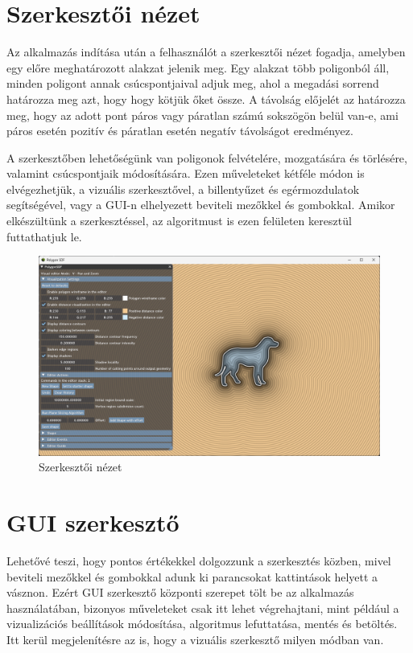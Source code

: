 \section{Szerkesztői nézet}

Az alkalmazás indítása után a felhasználót a szerkesztői nézet fogadja, amelyben egy előre meghatározott alakzat jelenik meg. Egy alakzat több poligonból áll, minden poligont annak csúcspontjaival adjuk meg, ahol a megadási sorrend határozza meg azt, hogy hogy kötjük őket össze. A távolság előjelét az határozza meg, hogy az adott pont páros vagy páratlan számú sokszögön belül van-e, ami páros esetén pozitív és páratlan esetén negatív távolságot eredményez.

A szerkesztőben lehetőségünk van poligonok felvételére, mozgatására és törlésére, valamint csúcspontjaik módosítására. Ezen műveleteket kétféle módon is elvégezhetjük, a vizuális szerkesztővel, a billentyűzet és egérmozdulatok segítségével, vagy a GUI-n elhelyezett beviteli mezőkkel és gombokkal. Amikor elkészültünk a szerkesztéssel, az algoritmust is ezen felületen keresztül futtathatjuk le.

\begin{figure}[H]
    \centering
    \includegraphics[width=1\linewidth]{images/editor.png}
    \caption{Szerkesztői nézet}
    \label{fig:editor-1}
\end{figure}

\section{GUI szerkesztő}

Lehetővé teszi, hogy pontos értékekkel dolgozzunk a szerkesztés közben, mivel beviteli mezőkkel és gombokkal adunk ki parancsokat kattintások helyett a vásznon.
Ezért GUI szerkesztő központi szerepet tölt be az alkalmazás használatában, bizonyos műveleteket csak itt lehet végrehajtani, mint például a vizualizációs beállítások módosítása, algoritmus lefuttatása, mentés és betöltés. Itt kerül megjelenítésre az is, hogy a vizuális szerkesztő milyen módban van.

